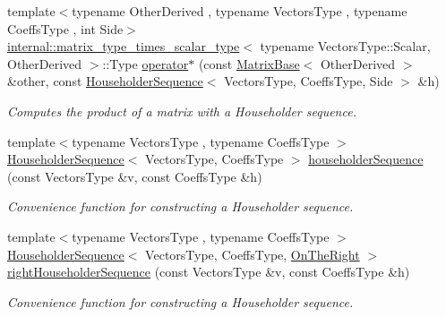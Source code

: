 \begin{DoxyCompactItemize}
{\footnotesize template$<$typename Other\+Derived , typename Vectors\+Type , typename Coeffs\+Type , int Side$>$ }\\\hyperlink{struct_eigen_1_1internal_1_1matrix__type__times__scalar__type}{internal\+::matrix\+\_\+type\+\_\+times\+\_\+scalar\+\_\+type}$<$ typename Vectors\+Type\+::\+Scalar, Other\+Derived $>$\+::Type \hyperlink{namespace_eigen_a6632b4f607fd51ab4560100fed76180f}{operator$\ast$} (const \hyperlink{group___core___module_class_eigen_1_1_matrix_base}{Matrix\+Base}$<$ Other\+Derived $>$ \&other, const \hyperlink{group___householder___module_class_eigen_1_1_householder_sequence}{Householder\+Sequence}$<$ Vectors\+Type, Coeffs\+Type, Side $>$ \&h)
\begin{DoxyCompactList}\small\item\em Computes the product of a matrix with a Householder sequence. \end{DoxyCompactList}\item 
{\footnotesize template$<$typename Vectors\+Type , typename Coeffs\+Type $>$ }\\\hyperlink{group___householder___module_class_eigen_1_1_householder_sequence}{Householder\+Sequence}$<$ Vectors\+Type, Coeffs\+Type $>$ \hyperlink{group___householder___module_ga4bd4b85120e014cf1125a054b02d4d92}{householder\+Sequence} (const Vectors\+Type \&v, const Coeffs\+Type \&h)
\begin{DoxyCompactList}\small\item\em Convenience function for constructing a Householder sequence. \end{DoxyCompactList}\item 
{\footnotesize template$<$typename Vectors\+Type , typename Coeffs\+Type $>$ }\\\hyperlink{group___householder___module_class_eigen_1_1_householder_sequence}{Householder\+Sequence}$<$ Vectors\+Type, Coeffs\+Type, \hyperlink{group__enums_ggac22de43beeac7a78b384f99bed5cee0ba99dc75d8e00b6c3a5bdc31940f47492b}{On\+The\+Right} $>$ \hyperlink{group___householder___module_ga59f16274f9e66f902f1a4b3f23e8b002}{right\+Householder\+Sequence} (const Vectors\+Type \&v, const Coeffs\+Type \&h)
\begin{DoxyCompactList}\small\item\em Convenience function for constructing a Householder sequence. \end{DoxyCompactList}\item 
\mbox{\label{namespace_eigen_a054138fa4cd47163a7d8d5972044ae09}} 

\end{DoxyCompactItemize}
